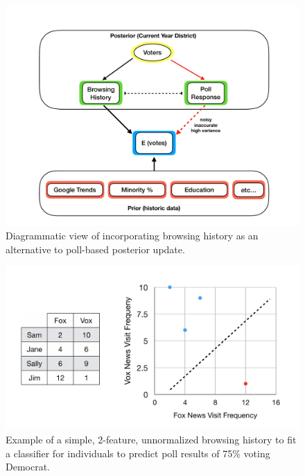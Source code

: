 \documentclass[12pt]{article}
\begin{document}
\begin{figure}[tbh]
  \centering
  \includegraphics[scale=0.3]{browsing_diagram.pdf}
  \caption{Diagrammatic view of incorporating browsing history as an alternative to poll-based posterior update.}
  \label{fig:browsing}
\end{figure}

\begin{figure}[tbh]
  \centering
  \includegraphics[scale=0.4]{browse_table}
  \caption{Example of a simple, 2-feature, unnormalized browsing history to fit a classifier for individuals to predict poll results of 75\% voting Democrat.}
  \label{fig:browse_table}
\end{figure}
\end{document}
